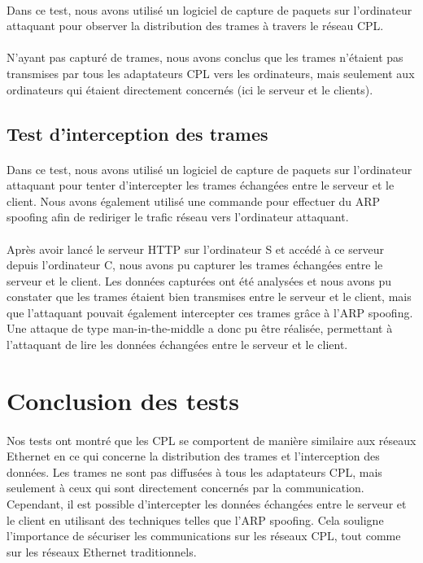 \documentclass[a4paper,twocolumn]{report}
\begin{document}
\paragraph{}Dans ce test, nous avons utilisé un logiciel de capture de paquets sur l'ordinateur attaquant pour observer la distribution des trames à travers le réseau CPL. 
\paragraph{}N'ayant pas capturé de trames, nous avons conclus que les trames n'étaient pas transmises par tous les adaptateurs CPL vers les ordinateurs, mais seulement aux ordinateurs qui étaient directement concernés (ici le serveur et le clients).

\subsection{Test d'interception des trames}
\paragraph{}Dans ce test, nous avons utilisé un logiciel de capture de paquets sur l'ordinateur attaquant pour tenter d'intercepter les trames échangées entre le serveur et le client. Nous avons également utilisé une commande pour effectuer du ARP spoofing afin de rediriger le trafic réseau vers l'ordinateur attaquant.
\paragraph{}Après avoir lancé le serveur HTTP sur l'ordinateur S et accédé à ce serveur depuis l'ordinateur C, nous avons pu capturer les trames échangées entre le serveur et le client. Les données capturées ont été analysées et nous avons pu constater que les trames étaient bien transmises entre le serveur et le client, mais que l'attaquant pouvait également intercepter ces trames grâce à l'ARP spoofing. Une attaque de type man-in-the-middle a donc pu être réalisée, permettant à l'attaquant de lire les données échangées entre le serveur et le client.

\section{Conclusion des tests}
\paragraph{}Nos tests ont montré que les CPL se comportent de manière similaire aux réseaux Ethernet en ce qui concerne la distribution des trames et l'interception des données. Les trames ne sont pas diffusées à tous les adaptateurs CPL, mais seulement à ceux qui sont directement concernés par la communication. Cependant, il est possible d'intercepter les données échangées entre le serveur et le client en utilisant des techniques telles que l'ARP spoofing. Cela souligne l'importance de sécuriser les communications sur les réseaux CPL, tout comme sur les réseaux Ethernet traditionnels.
\end{document}
